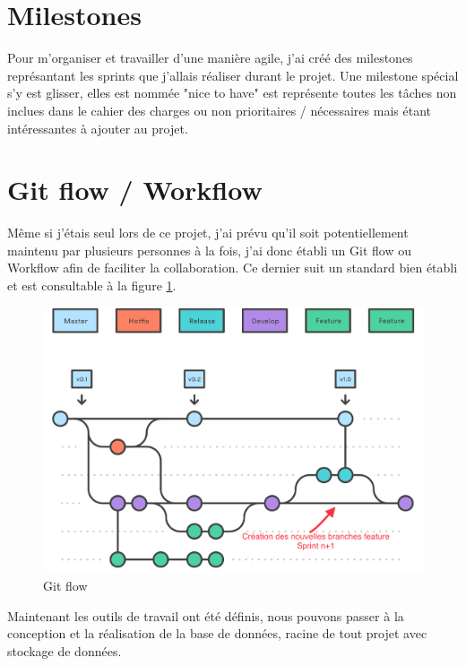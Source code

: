 \documentclass[
    iai, %
    il, %
]{heig-tb}
\begin{document}
\section{Milestones}
Pour m'organiser et travailler d'une manière agile, j'ai créé des milestones représantant les sprints que j'allais réaliser durant le projet. Une milestone spécial s'y est glisser, elles est nommée "nice to have" est représente toutes les tâches non inclues dans le cahier des charges ou non prioritaires / nécessaires mais étant intéressantes à ajouter au projet.

\section{Git flow / Workflow}
Même si j'étais seul lors de ce projet, j'ai prévu qu'il soit potentiellement maintenu par plusieurs personnes à la fois, j'ai donc établi un Git flow ou Workflow afin de faciliter la collaboration. Ce dernier suit un standard bien établi et est consultable à la figure \ref{git-flow}.

\begin{center}
    \begin{figure}
        \includegraphics[width=\textwidth]{./assets/figures/git-flow.png}
        \caption{Git flow \href{https://www.atlassian.com/fr/git/tutorials/comparing-workflows/gitflow-workflow} \label{git-flow}}
    \end{figure}
\end{center}

Maintenant les outils de travail ont été définis, nous pouvons passer à la conception et la réalisation de la base de données, racine de tout projet avec stockage de données.
\end{document}

